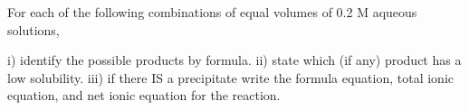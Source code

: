 \documentclass[fleqn]{exam}
\begin{document}
\begin{questions}

  \setcounter{question}{24}

  \question For each of the following combinations of equal volumes of 0.2 M aqueous solutions, \newline

  i) identify the possible products by formula. \newline
  ii) state which (if any) product has a low solubility. \newline
  iii) if there IS a precipitate write the formula equation, total ionic equation, and net ionic equation for
  the reaction. \newline
\end{questions}
\end{document}
